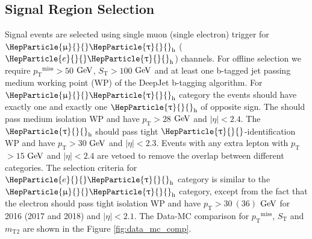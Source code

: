 \documentclass[12pt, a4paper]{article}
\newcommand{\pt}{\ensuremath{p_{\mathrm{T}}}\xspace}
\newcommand{\ptmiss}{\ensuremath{\pt^\text{miss}}}
\newcommand{\mTii}{\ensuremath{m_{\mathrm{T2}}}\xspace}
\newcommand{\ST}{\ensuremath{S_{\mathrm{T}}}\xspace}
\newcommand{\GeV}{\ensuremath{\text{Ge\hspace{-.08em}V}}{}\xspace}
\DeclareRobustCommand{\Pe}{{\HepParticle{e}{}{}}\xspace} %
\DeclareRobustCommand{\PGm}{{\HepParticle{\upmu}{}{}}\xspace} %
\DeclareRobustCommand{\PGt}{{\HepParticle{\uptau}{}{}}\xspace} %
\newcommand{\tauh}{\ensuremath{\PGt_\mathrm{h}}\xspace}
\begin{document}
\subsection{Signal Region Selection}
Signal events are selected using single muon (single electron) trigger for $\PGm\tauh$ ($\Pe\tauh$) channels. For offline selection we require \ptmiss$>50$ \GeV, \ST$>100$ \GeV and at least one b-tagged jet passing medium working point (WP) of the DeepJet b-tagging algorithm. For $\PGm\tauh$ category the events should have exactly one \PGm and exactly one \tauh of opposite sign. The \PGm should pass medium isolation WP and have $\pt>28$ \GeV and $|\eta|<2.4$. The \tauh should pass tight $\PGt$-identification WP and have $\pt>30$ \GeV and $|\eta|<2.3$.  Events with any extra lepton with \pt$>15$ \GeV and $|\eta|<2.4$ are vetoed to remove the overlap between different categories. The selection criteria for $\Pe\tauh$ category is similar to the $\PGm\tauh$ category, except from the fact that the electron should pass tight isolation WP and have $\pt>30~(36)$ \GeV for 2016 (2017 and 2018) and $|\eta|<2.1$. The Data-MC comparison for \ptmiss, \ST and \mTii are shown in the Figure \ref{fig:data_mc_comp}.
\end{document}
